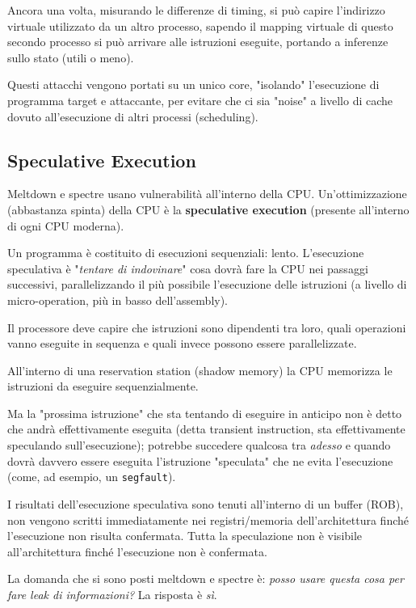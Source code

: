 Ancora una volta, misurando le differenze di timing, si può capire l'indirizzo virtuale utilizzato da un altro processo, sapendo il mapping virtuale di questo secondo processo si può arrivare alle istruzioni eseguite, portando a inferenze sullo stato (utili o meno).

Questi attacchi vengono portati su un unico core, "isolando" l'esecuzione di programma target e attaccante, per evitare che ci sia "noise" a livello di cache dovuto all'esecuzione di altri processi (scheduling).

\subsection{Speculative Execution}

Meltdown e spectre usano vulnerabilità all'interno della CPU. Un'ottimizzazione (abbastanza spinta) della CPU è la \textbf{speculative execution} (presente all'interno di ogni CPU moderna). 

Un programma è costituito di esecuzioni sequenziali: lento. L'esecuzione speculativa è "\textit{tentare di indovinare}" cosa dovrà fare la CPU nei passaggi successivi, parallelizzando il più possibile l'esecuzione delle istruzioni (a livello di micro-operation, più in basso dell'assembly).

Il processore deve capire che istruzioni sono dipendenti tra loro, quali operazioni vanno eseguite in sequenza e quali invece possono essere parallelizzate.

All'interno di una reservation station (shadow memory) la CPU memorizza le istruzioni da eseguire sequenzialmente. 

Ma la "prossima istruzione" che sta tentando di eseguire in anticipo non è detto che andrà effettivamente eseguita (detta transient instruction, sta effettivamente speculando sull'esecuzione); potrebbe succedere qualcosa tra \textit{adesso} e quando dovrà davvero essere eseguita l'istruzione "speculata" che ne evita l'esecuzione (come, ad esempio, un \texttt{segfault}).

I risultati dell'esecuzione speculativa sono tenuti all'interno di un buffer (ROB), non vengono scritti immediatamente nei registri/memoria dell'architettura finché l'esecuzione non risulta confermata. Tutta la speculazione non è visibile all'architettura finché l'esecuzione non è confermata.

La domanda che si sono posti meltdown e spectre è: \textit{posso usare questa cosa per fare leak di informazioni?} La risposta è \textit{sì}.

